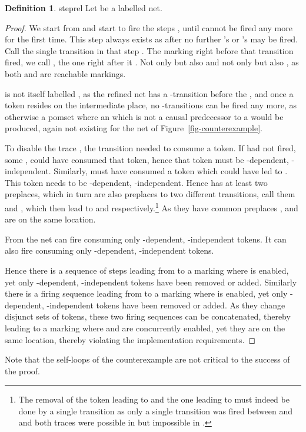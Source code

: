 \documentclass[submission,copyright,creativecommons]{eptcs}
\theoremstyle{definition}
\newtheorem{definition}{Definition}
\def\figurename{Figure}
\newcommand{\reffig}[1]{\figurename~\ref{fig-#1}}
\begin{document}
\begin{definition}{steprel}{
  Let  be a labelled net.
  }
\begin{proof}
  We start from  and start to fire the steps , 
  until  cannot be fired any more for the first time. This step always
  exists as after  no further 's or 's may be fired.
  Call the single transition in that step .
  The marking right before that transition fired, we call , the one right after it .
  Not only  but also  and not only  but also
  , as both  and  are reachable markings.

   is not itself labelled ,
  as the refined net has a -transition before the , and once a token
  resides on the intermediate place, no -transitions can be fired any more,
  as otherwise a pomset where an  which is not a causal predecessor to a  would be produced,
  again not existing for the net of \reffig{counterexample}.

  To disable the trace , the transition  needed to consume a token. If  had not fired,
  some ,  could have consumed that token,
  hence that token must be -dependent, -independent.
  Similarly,  must have consumed a token which could have led to .
  This token needs to be -dependent, -independent.
  Hence  has at least two preplaces, which in turn are also preplaces to two different
  transitions, call them  and , which then lead to  and  respectively.\footnote{The removal of the token leading to  and the one leading to  must indeed be done
  by a single transition  as only a single transition was fired between  and  and both
  traces were possible in  but impossible in .}
  As they have common preplaces ,  and  are on the same location.

  From  the net can fire  consuming only -dependent,
  -independent tokens. It can also fire  consuming only -dependent, -independent tokens. 

  Hence there is a sequence of steps leading from  to a marking where  is enabled, yet
  only -dependent, -independent tokens have been removed or added.
  Similarly there is a firing sequence leading from  to a marking where  is enabled, yet
  only -dependent, -independent tokens have been removed or added.
  As they change disjunct sets of tokens, these two firing sequences can be concatenated, thereby
  leading to a marking where  and  are concurrently enabled, yet they are on the same location,
  thereby violating the implementation requirements.
\end{proof}

\noindent
Note that the self-loops of the counterexample are not critical to the success of the proof.


\end{definition}
\end{document}
